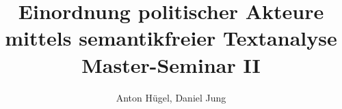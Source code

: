 \documentclass[oneside,12pt]{scrartcl}
\begin{document}
\begin{titlepage}
\author{Anton Hügel, Daniel Jung} 
\title{Einordnung politischer Akteure mittels semantikfreier Textanalyse \\ 
								{\normalsize Master-Seminar II}												} 
\maketitle

\end{titlepage}

\tableofcontents






\end{document}
